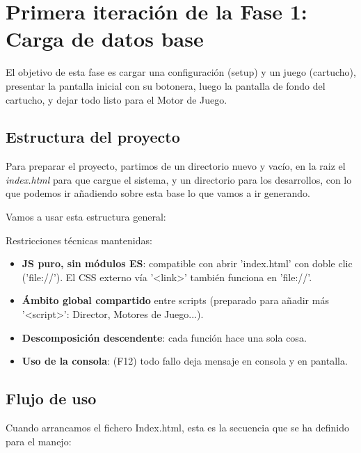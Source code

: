 	\section{Primera iteración de la Fase 1: Carga de datos base}
	\label{sec:Primera-iteracion}
	
	El objetivo de esta fase es cargar una configuración (setup) y un juego (cartucho), presentar la pantalla inicial con su botonera, luego la pantalla de fondo del cartucho, y dejar todo listo para el Motor de Juego.
	
	\subsection{Estructura del proyecto}
	
	Para preparar el proyecto, partimos de un directorio nuevo y vacío, en la raiz el \emph{index.html} para que cargue el sistema, y un directorio para los desarrollos, con lo que podemos ir añadiendo sobre esta base lo que vamos a ir generando.
	
	Vamos a usar esta estructura general:
	
	
	Restricciones técnicas mantenidas:
	\begin{itemize}
		\item \textbf{JS puro, sin módulos ES}: compatible con abrir 'index.html' con doble clic ('file://'). El CSS externo vía '<link>' también funciona en 'file://'.
		\item \textbf{Ámbito global compartido} entre scripts (preparado para añadir más '<script>': Director, Motores de Juego...).
		\item \textbf{Descomposición descendente}: cada función hace una sola cosa.
		\item \textbf{Uso de la consola}: (F12) todo fallo deja mensaje en consola y en pantalla.
	\end{itemize}
	
		\clearpage
		
	\subsection{Flujo de uso}
	
	Cuando arrancamos el fichero Index.html, esta es la secuencia que se ha definido para el manejo:
	
